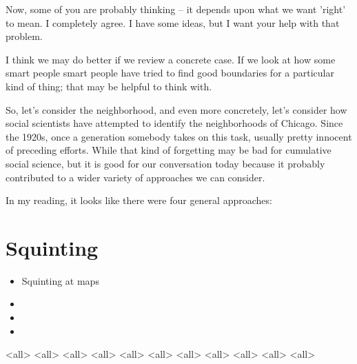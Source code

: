 Now, some of you are probably thinking -- it depends upon what we want
'right' to mean. I completely agree. I have some ideas, but I want
your help with that problem.

I think we may do better if we review a concrete case. If we look at
how some smart people smart people have tried to find good boundaries
for a particular kind of thing; that may be helpful to think with.

So, let's consider the neighborhood, and even more concretely, let's
consider how social scientists have attempted to identify the
neighborhoods of Chicago. Since the 1920s, once a generation somebody
takes on this task, usually pretty innocent of preceding efforts.
While that kind of forgetting may be bad for cumulative social
science, but it is good for our conversation today because it probably
contributed to a wider variety of approaches we can consider.

In my reading, it looks like there were four general approaches:

\begin{frame}
\begin{itemize}{}
\pause
{}
\pause
{}
\pause 
{}
\end{itemize}
\end{frame}

\section{Squinting}
{
\begin{frame}
\begin{itemize}{}
\item[] Squinting at maps
\item[] \color{gray}{Hand-tuned clustering of maps}
\item[] \color{gray}{Asking people to make the maps for us}
\item[] \color{gray}{Predicting neighborhoods}
\end{itemize}
\end{frame}
}


\mode<all>{
}
\mode<all>{
}
\mode<all>{
}
\mode<all>{
}
\mode<all>{
}
\mode<all>{
}
\mode<all>{
}
\mode<all>{
}
\mode<all>{
}
\mode<all>{
}
\mode<all>{
}


